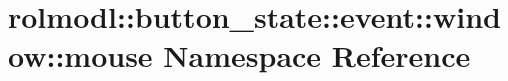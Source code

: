 \hypertarget{namespacerolmodl_1_1button__state_1_1event_1_1window_1_1mouse}{}\section{rolmodl\+::button\+\_\+state\+::event\+::window\+::mouse Namespace Reference}
\label{namespacerolmodl_1_1button__state_1_1event_1_1window_1_1mouse}
